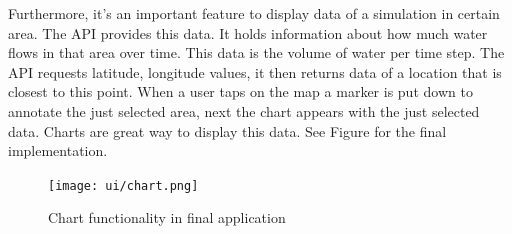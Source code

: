 Furthermore, it's an important feature to display data of a simulation in certain area. The API provides this data. It holds information about how much water flows in that area over time. This data is the volume of water per time step. The API requests latitude, longitude values, it then returns data of a location that is closest to this point. When a user taps on the map a marker is put down to annotate the just selected area, next the chart appears with the just selected data. Charts are great way to display this data. See Figure \label{fig:senchachart} for the final implementation.

\begin{figure}[H]
\center
	\texttt{[image: ui/chart.png]} \\
\caption{Chart functionality in final application}
\label{fig:senchachart}
\end{figure}

